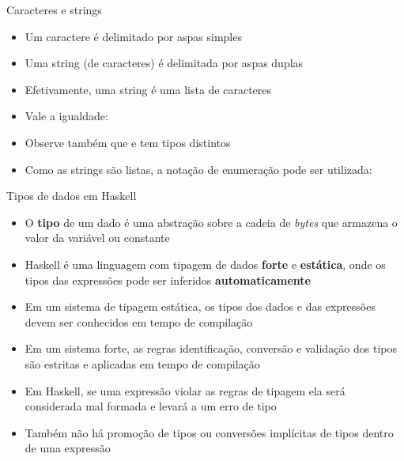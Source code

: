 \begin{frame}[fragile]{Caracteres e strings}

    \begin{itemize}
        \item Um caractere é delimitado por aspas simples


        \item Uma string (de caracteres) é delimitada por aspas duplas


        \item Efetivamente, uma string é uma lista de caracteres


        \item Vale a igualdade: 

        \item Observe também que  e  tem tipos distintos

        \item Como as strings são listas, a notação de enumeração pode ser utilizada:

    \end{itemize}

\end{frame}

\begin{frame}[fragile]{Tipos de dados em Haskell}

    \begin{itemize}
        \item O \textbf{tipo} de um dado é uma abstração sobre a cadeia de \textit{bytes} que
            armazena o valor da variável ou constante

        \item Haskell é uma linguagem com tipagem de dados \textbf{forte} e \textbf{estática},
            onde os tipos das expressões pode ser inferidos \textbf{automaticamente}

        \item Em um sistema de tipagem estática, os tipos dos dados e das expressões devem ser 
            conhecidos em tempo de compilação

        \item Em um sistema forte, as regras identificação, conversão e validação dos tipos
            são estritas e aplicadas em tempo de compilação

        \item Em Haskell, se uma expressão violar as regras de tipagem ela será considerada mal 
            formada e levará a um erro de tipo

        \item Também não há promoção de tipos ou conversões implícitas de tipos dentro de 
            uma expressão

    \end{itemize}

\end{frame}


